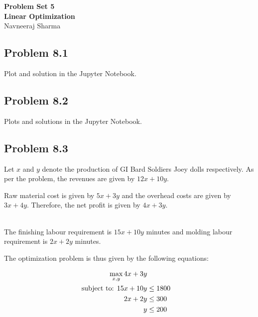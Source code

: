 \documentclass[letterpaper,12pt]{article}
\theoremstyle{definition}
\begin{document}
\begin{flushleft}
\textbf{\large{Problem Set 5}} \\
\vspace{2mm}
\textbf{\large{Linear Optimization}} \\
\vspace{2mm}
Navneeraj Sharma\\
\end{flushleft}

\vspace{2mm}

\subsection*{Problem 8.1 }

Plot and solution in the Jupyter Notebook.


\subsection*{Problem 8.2}

Plots and solutions in the Jupyter Notebook.

\subsection*{Problem 8.3 }

Let $x$ and $y$ denote the production of GI Bard Soldiers Joey dolls respectively.
As per the problem, the revenues are given by $12x + 10y$. \
\begin{flushleft}
Raw material cost is given by $5x+3y$ and the overhead costs are given by
$3x+4y$. Therefore, the net profit is given by $4x +3y$. \\\

The finishing labour requirement is $15x+10y$ minutes and molding labour requirement is $2x+2y$ minutes.
\end{flushleft}
The optimization problem is thus given by the following equations:

\begin{align*}
  \max_{{x,y}}4x+3y\\
  \textnormal{subject to: } 15x+10y &\leq 1800\\
   2x+2y &\leq 300\\
   y &\leq 200
\end{align*}
\end{document}

